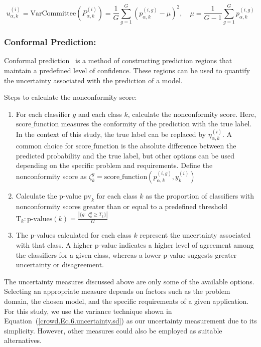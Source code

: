 \documentclass[pdflatex,bst/sn-basic]{bst/sn-jnl}%
\begin{document}
\begin{equation}
    u_{\alpha,k}^{(i)} = \mathrm{VarCommittee}\left(P_{\alpha,k}^{(i)}\right) = \frac{1}{G}\sum_{g=1}^G \left(p_{\alpha,k}^{(i,g)}-\mu\right)^{2},\quad\mu= \frac{1}{G-1} \sum_{g=1}^G p_{\alpha,k}^{(i,g)}
    \label{crowd.Eq.8.uncertainty.committee_based}
\end{equation}

\subsubsection{Conformal Prediction:}

Conformal prediction~\cite{angelopoulos_Gentle_2021} is a method of constructing prediction regions that maintain a predefined level of confidence. These regions can be used to quantify the uncertainty associated with the prediction of a model.

Steps  to calculate the nonconformity score:

\begin{enumerate}[1.]
    \item For each classifier $g $ and each class $k $, calculate the nonconformity score. Here, $\mathrm{score\_function}$ measures the conformity of the prediction with the true label. In the context of this study, the true label can be replaced by $\eta_{\alpha,k}^{(i)} $. A common choice for $\mathrm{score\_function}$ is the absolute difference between the predicted probability and the true label, but other options can be used depending on the specific problem and requirements. Define the nonconformity score as  $ \zeta_{k}^{g} = \mathrm{score\_function} \left(p_{\alpha,k}^{(i,g)}, y_k^{(i)}\right) $

    \item Calculate the p-value $\mathrm{pv}_k $ for each class $k $ as the proportion of classifiers with nonconformity scores greater than or equal to a predefined threshold $\text{T}_k: \text{p-values}(k) = \frac{ \left\vert \{g: \;\zeta_{k}^{g} \geq T_k \} \right\vert} {G} $

    \item The p-values calculated for each class $k $ represent the uncertainty associated with that class. A higher p-value indicates a higher level of agreement among the classifiers for a given class, whereas a lower p-value suggests greater uncertainty or disagreement.
\end{enumerate}

The uncertainty measures discussed above are only some of the available options. Selecting an appropriate measure depends on factors such as the problem domain, the chosen model, and the specific requirements of a given application. For this study, we use the variance technique shown in Equation~(\ref{crowd.Eq.6.uncertainty.sd}) as our uncertainty measurement due to its simplicity. However, other measures could also be employed as suitable alternatives.
\end{document}
